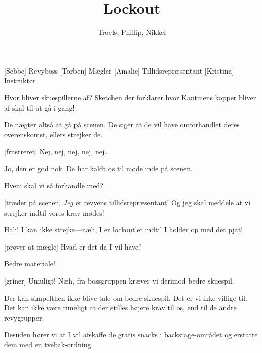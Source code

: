 \documentclass[a4paper,11pt]{article}
\title{Lockout}
\author{Troels, Phillip, Nikkel}
\begin{document}
\maketitle

\begin{roles}
  [Sebbe] Revyboss
  [Torben] Mægler
  [Amalie] Tillidsrepræsentant
  [Kristina] Instruktør
\end{roles}

\begin{props}
\end{props}


\begin{sketch}

   Hvor bliver skuespillerne af? Sketchen der forklarer hvor
  Kantinens kopper bliver af skal til at gå i gang!

   De nægter altså at gå på scenen. De siger at de vil
  have omforhandlet deres overenskomst, ellers strejker de.

  [frustreret] Nej, nej, nej, nej, nej\ldots

   Jo, den er god nok. De har kaldt os til møde inde på scenen.




   Hvem skal vi så forhandle med?

  [træder på scenen] \textit{Jeg} er revyens
  tillidsrepræsentant! Og jeg skal meddele at vi strejker indtil
  vores krav mødes!

   Hah! I kan ikke strejke---næh, I er lockout'et indtil
  I holder op med det pjat!

  [prøver at mægle]  Hvad er det da I vil have?

   Bedre materiale!

  [griner] Umuligt! Næh, fra bossgruppen kræver vi derimod
  bedre skuespil.

   Der kan simpelthen ikke blive tale om bedre skuespil. Det
  er vi ikke villige til. Det kan ikke være rimeligt at der stilles
  højere krav til os, end til de andre revygrupper.

  Desuden hører vi at I vil afskaffe de gratis snacks i
  backstage-området og erstatte dem med en tvebak-ordning.


\end{sketch}
\end{document}
